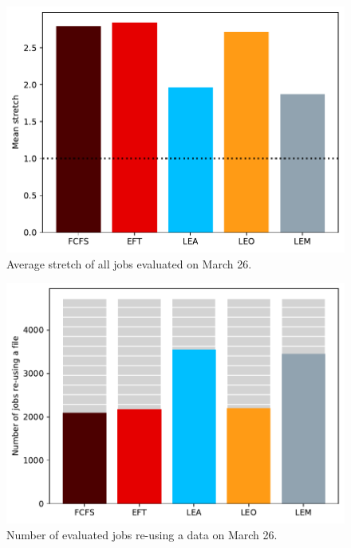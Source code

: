 \documentclass[conference,10pt]{IEEEtran}
\begin{document}
\begin{figure}[tb]\centering\includegraphics[scale=0.41]{../MBSS/plot/Results_FCFS_Score_Backfill_2022-03-26->2022-03-26_V10000_Mean_Stretch_450_128_32_256_4_1024.pdf}\caption{Average stretch of all jobs evaluated on March 26.}
\label{stretch.03-26}\end{figure}
\begin{figure}[tb]\centering\includegraphics[scale=0.41]{../MBSS/plot/Results_FCFS_Score_Backfill_2022-03-26->2022-03-26_V10000_Number_of_data_reuse_450_128_32_256_4_1024.pdf}\caption{Number of evaluated jobs re-using a data on March 26.}\label{reuse.03-26}\end{figure}
\end{document}

